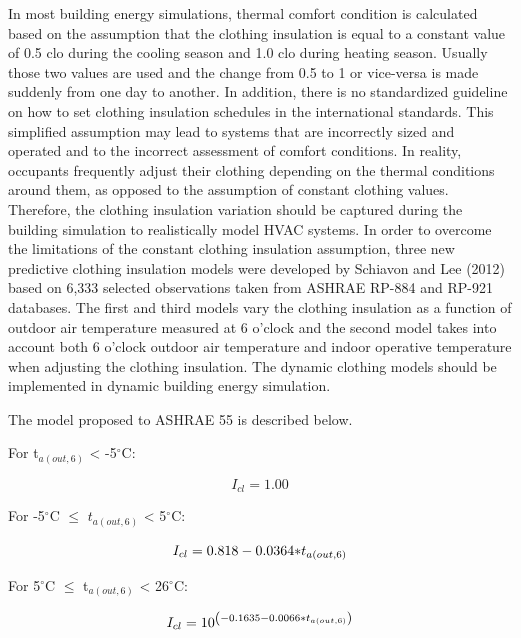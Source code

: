 In most building energy simulations, thermal comfort condition is calculated based on the assumption that the clothing insulation is equal to a constant value of 0.5 clo during the cooling season and 1.0 clo during heating season. Usually those two values are used and the change from 0.5 to 1 or vice-versa is made suddenly from one day to another. In addition, there is no standardized guideline on how to set clothing insulation schedules in the international standards. This simplified assumption may lead to systems that are incorrectly sized and operated and to the incorrect assessment of comfort conditions. In reality, occupants frequently adjust their clothing depending on the thermal conditions around them, as opposed to the assumption of constant clothing values. Therefore, the clothing insulation variation should be captured during the building simulation to realistically model HVAC systems. In order to overcome the limitations of the constant clothing insulation assumption, three new predictive clothing insulation models were developed by Schiavon and Lee (2012) based on 6,333 selected observations taken from ASHRAE RP-884 and RP-921 databases. The first and third models vary the clothing insulation as a function of outdoor air temperature measured at 6 o'clock and the second model takes into account both 6 o'clock outdoor air temperature and indoor operative temperature when adjusting the clothing insulation. The dynamic clothing models should be implemented in dynamic building energy simulation.

The model proposed to ASHRAE 55 is described below.

For t\(_{a(out,6)}\) \textless{} -5\(^{\circ}\)C:

\begin{equation}
{I_{cl}} = 1.00
\end{equation}

For -5\(^{\circ}\)C \(\leq\) \(t_{a(out,6)}\) \textless{} 5\(^{\circ}\)C:

\begin{equation}
{I_{cl}} = 0.818 - 0.0364{\rm{*}}{t_{a\left( {out,6} \right)}}
\end{equation}

For 5\(^{\circ}\)C \(\leq\) t\(_{a(out,6)}\) \textless{} 26\(^{\circ}\)C:

\begin{equation}
{I_{cl}} = {10^{\left( { - 0.1635 - 0.0066{\rm{*}}{t_{a\left( {out,6} \right)}}} \right)}}
\end{equation}

